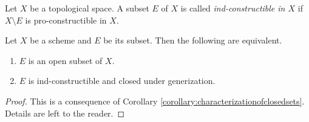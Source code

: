 \begin{definition}
Let $X$ be a topological space. A subset $E$ of $X$ is called  \textit{ind-constructible in $X$} if $X\setminus E$ is pro-constructible in $X$.
\end{definition}

\begin{corollary}
Let $X$ be a scheme and $E$ be its subset. Then the following are equivalent.
\begin{enumerate}[label=\emph{\textbf{(\roman*)}}, leftmargin=*]
\item $E$ is an open subset of $X$.
\item $E$ is ind-constructible and closed under generization.
\end{enumerate}
\end{corollary}
\begin{proof}
This is a consequence of Corollary \ref{corollary:characterizationofclosedsets}. Details are left to the reader.
\end{proof}
















































\small






